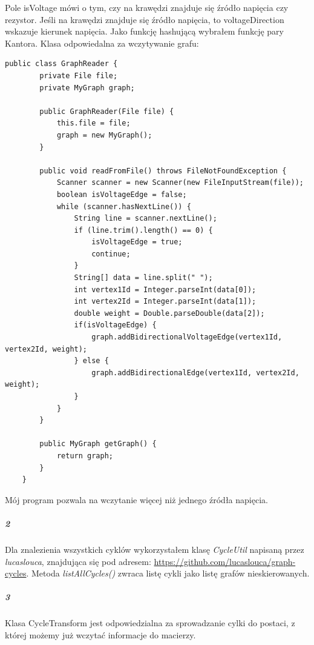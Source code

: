 \documentclass[12pt,a4paper]{article}
\begin{document}
Pole isVoltage mówi o tym, czy na krawędzi znajduje się źródło napięcia czy
rezystor. Jeśli na krawędzi znajduje się źródło napięcia, to voltageDirection
wskazuje kierunek napięcia. \newline
Jako funkcję hashującą wybrałem funkcję pary Kantora. \newline
Klasa odpowiedalna za wczytywanie grafu:
\begin{Verbatim}[fontsize=\small]
    public class GraphReader {
        private File file;
        private MyGraph graph;

        public GraphReader(File file) {
            this.file = file;
            graph = new MyGraph();
        }

        public void readFromFile() throws FileNotFoundException {
            Scanner scanner = new Scanner(new FileInputStream(file));
            boolean isVoltageEdge = false;
            while (scanner.hasNextLine()) {
                String line = scanner.nextLine();
                if (line.trim().length() == 0) {
                    isVoltageEdge = true;
                    continue;
                }
                String[] data = line.split(" ");
                int vertex1Id = Integer.parseInt(data[0]);
                int vertex2Id = Integer.parseInt(data[1]);
                double weight = Double.parseDouble(data[2]);
                if(isVoltageEdge) {
                    graph.addBidirectionalVoltageEdge(vertex1Id, vertex2Id, weight);
                } else {
                    graph.addBidirectionalEdge(vertex1Id, vertex2Id, weight);
                }
            }
        }

        public MyGraph getGraph() {
            return graph;
        }
    }
\end{Verbatim}
Mój program pozwala na wczytanie więcej niż jednego źródła napięcia.
\subparagraph{2} Dla znalezienia wszystkich cyklów wykorzystałem klasę \emph{CycleUtil}
napisaną przez \newline \mbox{\emph{lucaslouca}}, znajdująca się pod adresem:
\url{https://github.com/lucaslouca/graph-cycles}. \newline Metoda \mbox{\emph{listAllCycles()}} zwraca
listę cykli jako listę grafów nieskierowanych.
\subparagraph{3} Klasa CycleTransform jest odpowiedzialna za sprowadzanie cylki
do postaci, z której możemy już wczytać informacje do macierzy.
\end{document}
